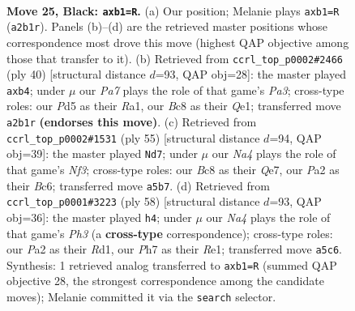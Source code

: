\documentclass[11pt]{article}
\begin{document}
\clearpage

\begin{figure}[p]\centering
\begin{subfigure}{0.46\textwidth}\centering
\resizebox{\linewidth}{!}{%
\newchessgame
\chessboard[
  setfen={rqb1k2r/p3b1pp/1p6/n2p1p2/P2P3P/4P1PB/pB1N2K1/1NQ1R3 b - - 0 25},
  showmover=false,
  pgfstyle=straightmove, color=movearrow, markmove={a2-b1}
]}
\caption{}
\end{subfigure}\hfill
\begin{subfigure}{0.46\textwidth}\centering
\resizebox{\linewidth}{!}{%
\newchessgame
\chessboard[
  setfen={3rk2r/5pp1/pq3n1p/2b1p3/1p4P1/PB5P/1PP1NP2/R3QRK1 w k - 3 21},
  showmover=false,
  pgfstyle=straightmove, color=movearrow, markmove={a3-b4}
]}
\caption{}
\end{subfigure}
\\[4pt]
\begin{subfigure}{0.46\textwidth}\centering
\resizebox{\linewidth}{!}{%
\newchessgame
\chessboard[
  setfen={1br3k1/1p2qpp1/2b2n2/1N6/P1B1p2p/1Q1nP2P/3N1PP1/B2R2K1 b - - 7 28},
  showmover=false,
  pgfstyle=straightmove, color=movearrow, markmove={f6-d7}
]}
\caption{}
\end{subfigure}\hfill
\begin{subfigure}{0.46\textwidth}\centering
\resizebox{\linewidth}{!}{%
\newchessgame
\chessboard[
  setfen={1r4k1/1q2bpp1/p3b2p/2pnP3/N1B3P1/1P5P/1QP5/1K1RR3 w - - 2 30},
  showmover=false,
  pgfstyle=straightmove, color=movearrow, markmove={h3-h4}
]}
\caption{}
\end{subfigure}
\caption{\textbf{Move 25, Black: \texttt{axb1=R}.} (a) Our position; Melanie plays \texttt{axb1=R} (\texttt{a2b1r}). Panels (b)--(d) are the retrieved master positions whose correspondence most drove this move (highest QAP objective among those that transfer to it). (b) Retrieved from \texttt{ccrl\_top\_p0002\#2466} (ply 40) [structural distance $d$=93, QAP obj=28]: the master played \texttt{axb4}; under $\mu$ our \emph{Pa7} plays the role of that game's \emph{Pa3}; cross-type roles: our \emph{P}d5 as their \emph{R}a1, our \emph{B}c8 as their \emph{Q}e1; transferred move \texttt{a2b1r} \textbf{(endorses this move)}. (c) Retrieved from \texttt{ccrl\_top\_p0002\#1531} (ply 55) [structural distance $d$=94, QAP obj=39]: the master played \texttt{Nd7}; under $\mu$ our \emph{Na4} plays the role of that game's \emph{Nf3}; cross-type roles: our \emph{B}c8 as their \emph{Q}e7, our \emph{P}a2 as their \emph{B}c6; transferred move \texttt{a5b7}. (d) Retrieved from \texttt{ccrl\_top\_p0001\#3223} (ply 58) [structural distance $d$=93, QAP obj=36]: the master played \texttt{h4}; under $\mu$ our \emph{Na4} plays the role of that game's \emph{Ph3} (a \textbf{cross-type} correspondence); cross-type roles: our \emph{P}a2 as their \emph{R}d1, our \emph{P}h7 as their \emph{R}e1; transferred move \texttt{a5c6}. Synthesis: 1 retrieved analog transferred to \texttt{axb1=R} (summed QAP objective 28, the strongest correspondence among the candidate moves); Melanie committed it via the \texttt{search} selector.}
\label{fig:thought-m49}
\end{figure}
\end{document}
